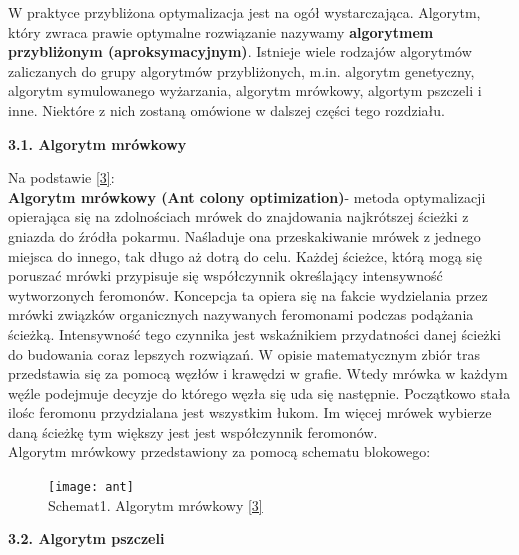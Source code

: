 \documentclass[a4paper, twoside, 12pt, justified]{article}
\begin{document}
	W praktyce przybliżona optymalizacja jest na ogół wystarczająca. Algorytm, który zwraca prawie optymalne
	rozwiązanie nazywamy \textbf{algorytmem przybliżonym (aproksymacyjnym)}. Istnieje wiele rodzajów algorytmów zaliczanych do grupy algorytmów przybliżonych, m.in. algorytm genetyczny, algorytm symulowanego wyżarzania, algorytm mrówkowy, algortym pszczeli i inne. Niektóre z nich zostaną omówione w dalszej części tego rozdziału.\\
	
	\newpage
	
	\begin{flushleft}
		\begin{large}
			\textbf{3.1. Algorytm mrówkowy}
		\end{large}
	\end{flushleft}
	\vspace{5mm} %

	Na podstawie \hyperlink{ant}{[3]}:\\
	\textbf{Algorytm mrówkowy (Ant colony optimization)}- metoda optymalizacji opierająca się na zdolnościach mrówek do znajdowania najkrótszej ścieżki z gniazda do źródła pokarmu. Naśladuje ona przeskakiwanie mrówek z jednego miejsca do innego, tak długo aż dotrą do celu. Każdej ścieżce, którą mogą się poruszać mrówki przypisuje się współczynnik określający intensywność wytworzonych feromonów. Koncepcja ta opiera się na fakcie wydzielania przez mrówki związków organicznych nazywanych feromonami podczas podążania ścieżką. Intensywność tego czynnika jest wskaźnikiem przydatności danej ścieżki do budowania coraz lepszych rozwiązań. W opisie matematycznym zbiór tras przedstawia się za pomocą węzłów i krawędzi w grafie. Wtedy mrówka w każdym węźle podejmuje decyzje do którego węzła się uda się następnie. Początkowo stała ilośc feromonu przydzialana jest wszystkim łukom. Im więcej mrówek wybierze daną ścieżkę tym większy jest jest współczynnik feromonów.\\
	Algorytm mrówkowy przedstawiony za pomocą schematu blokowego:\\
	\begin{figure}[h]
		\texttt{[image: ant]}
		\centering
		\\
		{Schemat1. Algorytm mrówkowy \hyperlink{ant}{[3]} } 
	\end{figure}
	
	\newpage
	
	\begin{flushleft}
		\begin{large}
			\textbf{3.2. Algorytm pszczeli}
		\end{large}
	\end{flushleft}
	\vspace{5mm} %
	
\end{document}
